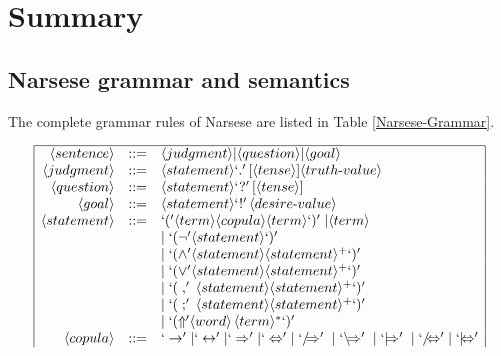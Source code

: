 
\chapter{Summary}

\section{Narsese grammar and semantics}

The complete grammar rules of Narsese are listed in Table \ref{Narsese-Grammar}.

\begin{table}[hbt]
\small
\centering
\[\begin{array}{|rcl|} \hline
\langle  sentence \rangle  & ::= & \langle  judgment \rangle  | \langle  question \rangle  | \langle  goal \rangle  \\
\langle judgment \rangle & ::= & \langle statement \rangle `.' \, [\langle tense \rangle] \langle truth \mbox{-} value \rangle \\
\langle question \rangle & ::= & \langle statement \rangle `?' \, [\langle tense \rangle] \\ 
\langle  goal \rangle  & ::= & \langle  statement \rangle  `!' \, \langle  desire \mbox{-} value \rangle \\
\langle  statement \rangle  & ::= & `('\langle term \rangle \langle copula \rangle \langle term \rangle `)' \; | \langle  term \rangle  \\ &&
                       | \; `(\neg' \langle statement \rangle `)'\\ &&
                  		 | \; `(\wedge' \langle statement \rangle \langle statement \rangle^+ `)' \\ &&
                  		 | \; `(\vee' \langle statement \rangle \langle statement \rangle^+ `)' \\ &&
                  		 | \; `(\;,'\; \langle statement \rangle \langle statement \rangle^+ `)' \\ &&
                  		 | \; `(\;;'\; \langle statement \rangle \langle statement \rangle^+ `)' \\ &&
                  		 | \; `(\Uparrow\!\!'\langle word \rangle \, \langle term \rangle^* `)' \\ 
\langle copula \rangle & ::= & `\rightarrow' | `\leftrightarrow' | `\Rightarrow' | `\Leftrightarrow'
                     | \;`/\!\!\!\Rightarrow'\; | \;`\backslash\!\!\!\Rightarrow'\; | \;`|\!\!\!\Rightarrow'\;
                     | \;`/\!\!\!\Leftrightarrow' | \;`|\!\!\!\Leftrightarrow'\\

\end{array}\]
\end{table}
